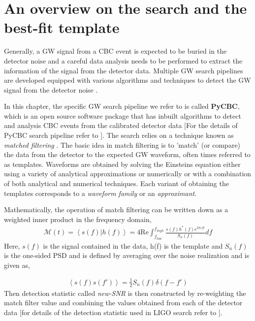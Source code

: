 \section{An overview on the search and the best-fit template }
Generally, a GW signal from a CBC event is expected to be buried in the detector noise and a careful data analysis needs to be performed to extract the information of the signal from the detector data. Multiple GW search pipelines are developed equipped with various algorithms and techniques to detect the GW signal from the detector noise \cite{GSTLAL1,GSTLAL2,Canton:2014ena,Usman:2015kfa,Nitz:2017svb}.  

In this chapter, the specific GW search pipeline we refer to is called \textbf{PyCBC}, which is an open source software package that has inbuilt algorithms to detect and analysis CBC events from the calibrated detector data [For the details of PyCBC search pipeline refer to \cite{Usman:2015kfa}]. The search relies on a  technique known as \textit{matched filtering} \cite{SchutzBF, JCreightonBook}. The basic idea in match filtering is to 'match' (or compare) the data from the detector to the expected GW waveform, often times referred to as templates. Waveforms are obtained by solving the Einsteins equation either using a variety of analytical approximations or numerically or with a combination of both analytical and numerical techniques.  Each variant of obtaining the templates corresponds to a \textit{waveform family} or an \textit{approximant}.

Mathematically, the operation of match filtering can be written down as a weighted inner product in the frequency domain,
\begin{align}
\mathcal{M}(t) = \left\langle s(f)| h(f) \right\rangle = 4 \mathrm{Re} \int^{f_{high}}_{f_{low}} \frac{s(f) h^{*}(f) e^{2 \pi \iota f t}}{S_{n}(f)} df
\end{align}
Here, $s(f)$ is the signal contained in the data, h(f) is the template and $S_{n}(f)$ is the one-sided PSD and is defined by averaging over the noise realization and is given as,

\begin{align}
\left\langle s(f)s(f') \right\rangle = \frac{1}{2} S_{n}(f) \delta(f-f') 
\end{align}
Then detection statistic called \textit{new-SNR} is then constructed by re-weighting the match filter value and combining the values obtained from each of the detector data [for details of the detection statistic used in LIGO search refer to \cite{newSNR1,newSNR2,FindChirp,Usman:2015kfa}].  

